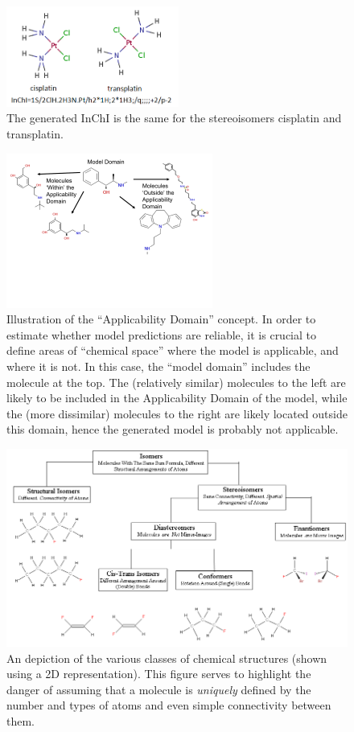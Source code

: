 \documentclass{sig-alternate}
\begin{document}
\begin{figure}
\centering
\includegraphics[height=1.3in]{platins.png}
\caption{The generated InChI is the same for the stereoisomers cisplatin and transplatin.}
\label{figure:cistrans}
\end{figure}
%
\begin{figure}
\centering
\includegraphics[height=2in]{CACM_ApplicabilityDomain.pdf}
\caption{Illustration of the ``Applicability Domain'' concept. In order to estimate whether model predictions are reliable, it is crucial to define areas of ``chemical space'' where the model is applicable, and where it is not. In this case, the ``model domain'' includes the molecule at the top. The (relatively similar) molecules to the left are likely to be included in the Applicability Domain of the model, while the (more dissimilar) molecules to the right are likely located outside this domain, hence the generated model is probably not applicable.}
\label{figure:applicability-domain}
\end{figure}
%
\begin{figure}
\centering
\includegraphics[width=\linewidth]{cacm_tautomers.png}
\caption{An depiction of the various classes of chemical structures
  (shown using a 2D representation). This figure serves to highlight
  the danger of assuming that a molecule is \emph{uniquely} defined by
the number and types of atoms and even simple connectivity between them.}
\label{fig:structure-classes}
\end{figure}
%
\end{document}
